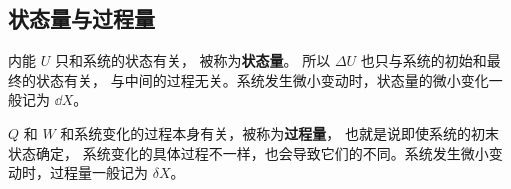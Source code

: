 \subsection{状态量与过程量}
内能 $U$ 只和系统的状态有关， 被称为\textbf{状态量}。 所以 $\Delta U$ 也只与系统的初始和最终的状态有关， 与中间的过程无关。系统发生微小变动时，状态量的微小变化一般记为 $\dd X$。

$Q$ 和 $W$ 和系统变化的过程本身有关，被称为\textbf{过程量}， 也就是说即使系统的初末状态确定， 系统变化的具体过程不一样，也会导致它们的不同。系统发生微小变动时，过程量一般记为 $\delta X$。


